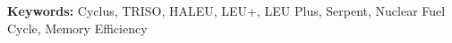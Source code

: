 



\textbf{Keywords:} Cyclus, TRISO, HALEU, LEU+, LEU Plus, Serpent, Nuclear Fuel Cycle, Memory Efficiency